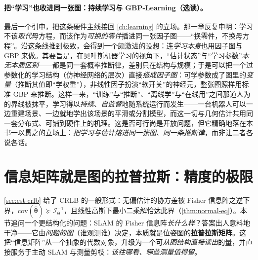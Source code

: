 \paragraph{把“学习”也收进同一张图：持续学习与 GBP-Learning（选读）。}
最后一个引申，把这条硬件主线接回 \cref{ch:learning} 的立场。那一章反复申明：学习不该\emph{取代}母方程，而该作为\emph{可换的零件}插进同一张因子图——“换零件，不换母方程”。沿这条线推到极致，会得到一个颇激进的设想\cite{davison2026computational}：连\emph{学习本身}也用因子图与 GBP 来做。其要旨是，在贝叶斯机器学习的视角下，“估计状态”与“学习参数”\emph{本无本质区别}——都是同一套概率推断律，差别只在结构与规模；于是可以把一个过参数化的学习结构（仿神经网络的层次）直接\emph{搭成因子图}：可学参数成了图里的\emph{变量}（推断其值即“学权重”），非线性因子扮演“软开关”的神经元，整张图照样用标准 GBP 来推断。这样一来，“训练”与“推断”、“离线学”与“在线用”之间那道人为的界线被抹平，学习得以\emph{持续}、\emph{自监督}地随系统运行而发生——一台机器人可以一边重建场景、一边就地学出该场景的平滑或分割模型，而这一切与几何估计共用同一套分布式、可铺到硬件上的机理。这是否可行尚是开放问题，但它精确地落在本书一以贯之的立场上：\emph{把学习与估计熔进同一张图、同一条推断律}，而非让二者各说各话。

\section{信息矩阵就是图的拉普拉斯：精度的极限}
\label{sec:est-fim-laplacian}

\cref{sec:est-crlb} 给了 CRLB 的一般形式：无偏估计的协方差被 Fisher 信息阵之逆下界，$\mathrm{cov}(\hat{\boldsymbol{\theta}})\succeq\boldsymbol{\mathcal{I}}_{\boldsymbol{\theta}}^{-1}$，且线性高斯下最小二乘解恰达此界（\cref{thm:normal-eq}）。本节追问一个更结构化的问题：SLAM 的 Fisher 信息阵\emph{长什么样}？答案出人意料地干净——它由\emph{问题的图}（谁观测谁）决定，本质就是位姿图的\textbf{拉普拉斯矩阵}\cite{carlone2026handbook}。这把“信息矩阵”从一个抽象的代数对象，升级为一个可\emph{从图结构直接读出}的量，并直接服务于主动 SLAM 与测量剪枝：\emph{该往哪看、哪些测量值得留}。


